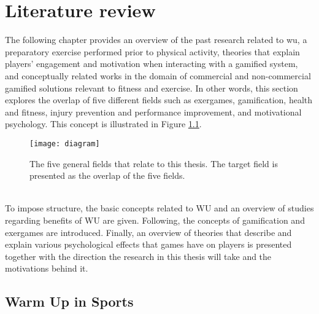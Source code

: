 \chapter{Literature review}\label{chapter:relatedwork}
The following chapter provides an overview of the past research related to \acrfull{wu}, a preparatory exercise performed prior to physical activity, theories that explain players' engagement and motivation when interacting with a gamified system, and conceptually related works in the domain of commercial and non-commercial gamified solutions relevant to fitness and exercise. In other words, this section explores the overlap of five different fields such as exergames, gamification, health and fitness, injury prevention and performance improvement, and motivational psychology. This concept is illustrated in Figure \ref{fig:diagram}.
\begin{figure}[h]
    \centering
    \texttt{[image: diagram]}
    \caption{The five general fields that relate to this thesis. The target field is presented as the overlap of the five fields.}
    \label{fig:diagram}
\end{figure}\\
To impose structure, the basic concepts related to WU and an overview of studies regarding benefits of WU are given. Following, the concepts of gamification and exergames are introduced. Finally, an overview of theories that describe and explain various psychological effects that games have on players is presented together with the direction the research in this thesis will take and the motivations behind it.
\section{Warm Up in Sports}

